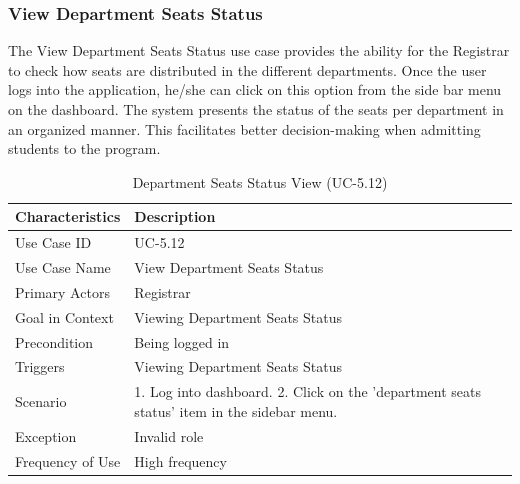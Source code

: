 \subsubsection{View Department Seats Status}
The View Department Seats Status use case provides the ability for the Registrar to check how seats are distributed in the different departments. Once the user logs into the application, he/she can click on this option from the side bar menu on the dashboard. The system presents the status of the seats per department in an organized manner. This facilitates better decision-making when admitting students to the program.
\begin{table}[H]
    \centering
    \small
    \renewcommand{\arraystretch}{1.5}
    \caption{Department Seats Status View (UC-5.12)} %
    \label{tab:view-dept-seats-registrar}
    \begin{tabularx}{\textwidth}{|l|X|}
        \hline
        \rowcolor[gray]{0.9} {Characteristics} & {Description} \\ \hline
        Use Case ID & UC-5.12 \\ \hline
        Use Case Name & View Department Seats Status \\ \hline
        Primary Actors & Registrar \\ \hline
        Goal in Context & Viewing Department Seats Status \\ \hline
        Precondition & Being logged in \\ \hline
        Triggers & Viewing Department Seats Status \\ \hline
        Scenario & 1. Log into dashboard. 2. Click on the 'department seats status' item in the sidebar menu. \\ \hline
        Exception & Invalid role \\ \hline
        Frequency of Use & High frequency \\ \hline
    \end{tabularx}
\end{table}
\FloatBarrier